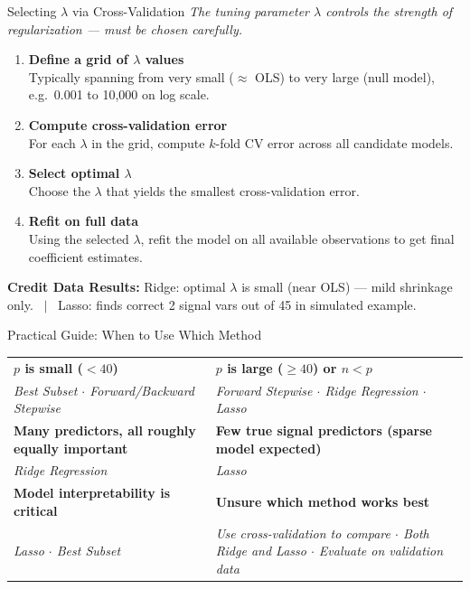 \documentclass[ignorenonframetext,]{beamer}
\begin{document}
\begin{frame}{Selecting $\lambda$ via Cross-Validation}
\emph{The tuning parameter $\lambda$ controls the strength of regularization --- must be chosen carefully.}

\footnotesize
\begin{enumerate}
	\item \textbf{Define a grid of $\lambda$ values}\\
	{\scriptsize Typically spanning from very small ($\approx$ OLS) to very large (null model), e.g.\ 0.001 to 10,000 on log scale.}
	\item \textbf{Compute cross-validation error}\\
	{\scriptsize For each $\lambda$ in the grid, compute $k$-fold CV error across all candidate models.}
	\item \textbf{Select optimal $\lambda$}\\
	{\scriptsize Choose the $\lambda$ that yields the smallest cross-validation error.}
	\item \textbf{Refit on full data}\\
	{\scriptsize Using the selected $\lambda$, refit the model on all available observations to get final coefficient estimates.}
\end{enumerate}

{\scriptsize \textbf{Credit Data Results:} Ridge: optimal $\lambda$ is small (near OLS) --- mild shrinkage only. \ $|$ \ Lasso: finds correct 2 signal vars out of 45 in simulated example.}
\end{frame}

\begin{frame}{Practical Guide: When to Use Which Method}
\small
\begin{tabular}{@{}p{}|p{}@{}}
\toprule
\textbf{$p$ is small ($< 40$)} & \textbf{$p$ is large ($\geq 40$) or $n < p$}\\
\emph{Best Subset $\cdot$ Forward/Backward Stepwise} & \emph{Forward Stepwise $\cdot$ Ridge Regression $\cdot$ Lasso}\\
\midrule
\textbf{Many predictors, all roughly equally important} & \textbf{Few true signal predictors (sparse model expected)}\\
\emph{Ridge Regression} & \emph{Lasso}\\
\midrule
\textbf{Model interpretability is critical} & \textbf{Unsure which method works best}\\
\emph{Lasso $\cdot$ Best Subset} & \emph{Use cross-validation to compare $\cdot$ Both Ridge and Lasso $\cdot$ Evaluate on validation data}\\
\bottomrule
\end{tabular}
\end{frame}
\end{document}
